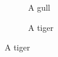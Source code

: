 \documentclass[a4paper,11pt]{article}
\begin{document}
\begin{figure}
    \centering
    \begin{subfigure}[b]{0.49\textwidth}
    	\resizebox{\linewidth}{!}{}
	    \caption{A gull}
	    \label{fig:gull}
	\end{subfigure}
    \begin{subfigure}[b]{0.49\textwidth}
    	\resizebox{\linewidth}{!}{}
        \caption{A tiger}
        \label{fig:tiger}
    \end{subfigure}
\end{figure}

  
  
  
\end{document}
